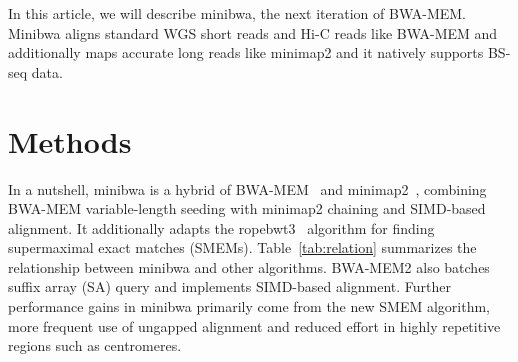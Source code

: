 \documentclass[webpdf,contemporary,large,namedate]{oup-authoring-template}%
\begin{document}
%

In this article, we will describe minibwa, the next iteration of BWA-MEM.
Minibwa aligns standard WGS short reads and Hi-C reads like BWA-MEM
and additionally maps accurate long reads like minimap2 and it natively supports BS-seq data.

\section{Methods}

In a nutshell, minibwa is a hybrid of BWA-MEM~\citep{Li:2013aa} and minimap2~\citep{Li:2018ab},
combining BWA-MEM variable-length seeding with minimap2 chaining and SIMD-based alignment.
It additionally adapts the ropebwt3~\citep{Li:2024ac} algorithm for finding supermaximal exact matches (SMEMs).
Table~\ref{tab:relation} summarizes the relationship between minibwa and other algorithms.
BWA-MEM2 also batches suffix array (SA) query and implements SIMD-based alignment.
Further performance gains in minibwa primarily come from the new SMEM algorithm,
more frequent use of ungapped alignment and reduced effort in highly repetitive regions such as centromeres.
\end{document}
